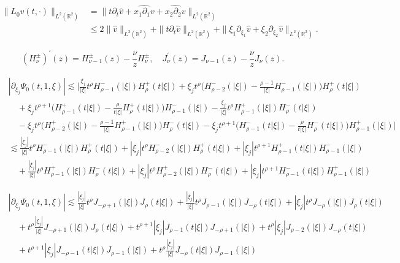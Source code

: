 \documentclass[10pt,a4paper]{amsart}
\newcommand{\R}{\mathbb R}
\newcommand{\f}{\frac}
\newcommand{\p}{\partial}
\begin{document}
\begin{equation}\label{equ:q45}
\begin{aligned}
\|L_0v(t, \cdot)\|_{L^2(\R^2)}& =\|t\p_t\hat{v}+\widehat{x_1\p_1v}+\widehat{x_2\p_2v}\|_{L^2(\R^2)}\\
&\leq 2\|\hat{v}\|_{L^2(\R^2)}+\|t\p_t\hat{v}\|_{L^2(\R^2)}+\|\xi_1\p_{\xi_1}\hat{v}+\xi_2\p_{\xi_2}\hat{v}\|_{L^2(\R^2)}.
\end{aligned}
\end{equation}

\begin{equation}\label{dr1}
(H_\nu^{\pm})^{\prime}(z)=H_{\nu-1}^{\pm}(z)-\frac{\nu}{z}H_\nu^{\pm},\quad
J_\nu^{\prime}(z)=J_{\nu-1}(z)-\frac{\nu}{z}J_\nu(z).
\end{equation}

\begin{equation}\label{equ:q51}
 \begin{aligned}
& |\p_{\xi_j}\Psi_0(t, 1, \xi)|
\lesssim |\frac{\xi_j}{|\xi|} t^\rho H_{\rho-1}^{-}(|\xi|) H_\rho^{+}(t|\xi|)+\xi_j t^\rho\big(H_{\rho-2}^{-}(|\xi|)-\frac{\rho-1}{|\xi|} H_{\rho-1}^{-}(|\xi|)\big) H_\rho^{+}(t|\xi|) \\
&\quad +\xi_j t^{\rho+1}\big(H_{\rho-1}^{+}(t|\xi|)-\frac{\rho}{t|\xi|} H_\rho^{+}(t|\xi|)\big) H_{\rho-1}^{-}(|\xi|)
-\frac{\xi_j}{|\xi|} t^\rho H_{\rho-1}^{+}(|\xi|) H_\rho^{-}(t|\xi|)\\
&\quad -\xi_j t^\rho\big(H_{\rho-2}^{+}(|\xi|)-\frac{\rho-1}{|\xi|} H_{\rho-1}^{+}(|\xi|)\big) H_\rho^{-}(t|\xi|)-\xi_j t^{\rho+1}\big(H_{\rho-1}^{-}(t|\xi|)-\frac{\rho}{t|\xi|} H_\rho^{-}(t|\xi|)\big) H_{\rho-1}^{+}(|\xi|)|\\
& \lesssim \frac{|\xi_j|}{|\xi|} t^\rho H_{\rho-1}^{-}(|\xi|) H_\rho^{+}(t|\xi|)+|\xi_j| t^\rho H_{\rho-2}^{-}(|\xi|) H_\rho^{+}(t|\xi|)+|\xi_j| t^{\rho+1} H_{\rho-1}^{+}(t|\xi|) H_{\rho-1}^{-}(|\xi|) \\
&\quad +\frac{|\xi_j|}{|\xi|} t^\rho H_{\rho-1}^{+}(|\xi|) H_\rho^{-}(t|\xi|)+|\xi_j| t^\rho H_{\rho-2}^{+}(|\xi|) H_\rho^{-}(t|\xi|)+|\xi_j| t^{\rho+1} H_{\rho-1}^{-}(t|\xi|) H_{\rho-1}^{+}(|\xi|)
\end{aligned}
\end{equation}

\begin{equation}\label{equ:q55}
\begin{aligned}
& |\p_{\xi_j}\Psi_0(t, 1, \xi)|
\lesssim \frac{|\xi_j|}{|\xi|} t^\rho J_{-\rho+1}(|\xi|) J_\rho(t|\xi|)+\frac{|\xi_j|}{|\xi|} t^\rho J_{\rho-1}(|\xi|) J_{-\rho}(t|\xi|)
+|\xi_j| t^\rho J_{-\rho}(|\xi|) J_\rho(t|\xi|)\\
&\quad +t^{\rho}\f{|\xi_j|}{|\xi|} J_{-\rho+1}(|\xi|) J_{\rho}(t|\xi|) +t^{\rho+1}|\xi_j| J_{\rho-1}(t|\xi|) J_{-\rho+1}(|\xi|)
+t^\rho|\xi_j| J_{\rho-2}(|\xi|) J_{-\rho}(t|\xi|)\\
&\quad +t^{\rho+1}|\xi_j| J_{-\rho-1}(t|\xi|) J_{\rho-1}(|\xi|)+t^{\rho}\f{|\xi_j|}{|\xi|} J_{-\rho}(t|\xi|) J_{\rho-1}(|\xi|)
\end{aligned}
\end{equation}
\end{document}
